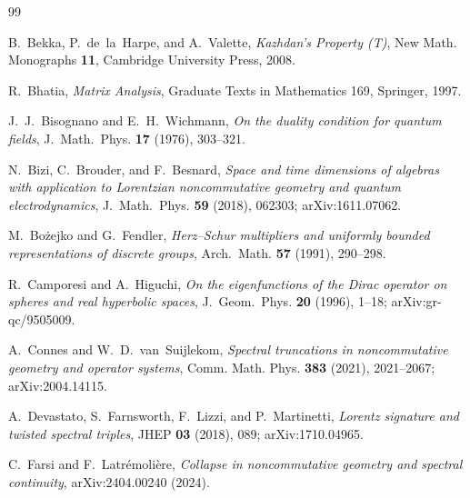 \documentclass[11pt,a4paper]{article}
\theoremstyle{plain}
\theoremstyle{definition}
\begin{document}
\begin{thebibliography}{99}

B.~Bekka, P.~de~la~Harpe, and A.~Valette,
\newblock \emph{Kazhdan's Property (T)},
\newblock New Math. Monographs \textbf{11}, Cambridge University Press, 2008.

R.~Bhatia,
\newblock \emph{Matrix Analysis},
\newblock Graduate Texts in Mathematics 169, Springer, 1997.

J.~J.~Bisognano and E.~H.~Wichmann,
\newblock \emph{On the duality condition for quantum fields},
\newblock J.~Math.~Phys. \textbf{17} (1976), 303--321.

N.~Bizi, C.~Brouder, and F.~Besnard,
\newblock \emph{Space and time dimensions of algebras with application
to Lorentzian noncommutative geometry and quantum electrodynamics},
\newblock J.~Math.~Phys. \textbf{59} (2018), 062303;
\newblock arXiv:1611.07062.

M.~Bo\.zejko and G.~Fendler,
\newblock \emph{Herz--Schur multipliers and uniformly bounded
representations of discrete groups},
\newblock Arch.~Math. \textbf{57} (1991), 290--298.

R.~Camporesi and A.~Higuchi,
\newblock \emph{On the eigenfunctions of the Dirac operator on spheres
and real hyperbolic spaces},
\newblock J.~Geom.~Phys. \textbf{20} (1996), 1--18;
\newblock arXiv:gr-qc/9505009.

A.~Connes and W.~D.~van~Suijlekom,
\newblock \emph{Spectral truncations in noncommutative geometry and
operator systems},
\newblock Comm. Math. Phys. \textbf{383} (2021), 2021--2067;
\newblock arXiv:2004.14115.

A.~Devastato, S.~Farnsworth, F.~Lizzi, and P.~Martinetti,
\newblock \emph{Lorentz signature and twisted spectral triples},
\newblock JHEP \textbf{03} (2018), 089; arXiv:1710.04965.

C.~Farsi and F.~Latr\'emoli\`ere,
\newblock \emph{Collapse in noncommutative geometry and spectral
continuity},
\newblock arXiv:2404.00240 (2024).


\end{thebibliography}
\end{document}
